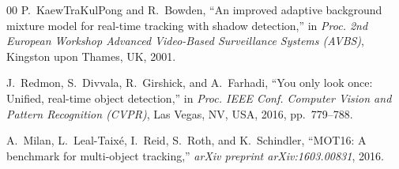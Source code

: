 \documentclass[10pt, conference, compsocconf]{IEEEtran}
\begin{document}
\begin{thebibliography}{00}
P.~KaewTraKulPong and R.~Bowden,
``An improved adaptive background mixture model for real-time
tracking with shadow detection,''
in \emph{Proc. 2nd European Workshop Advanced Video-Based
Surveillance Systems (AVBS)}, Kingston upon Thames, UK, 2001.

J.~Redmon, S.~Divvala, R.~Girshick, and A.~Farhadi,
``You only look once: Unified, real-time object detection,''
in \emph{Proc. IEEE Conf. Computer Vision and Pattern Recognition
(CVPR)}, Las Vegas, NV, USA, 2016, pp.~779--788.

A.~Milan, L.~Leal-Taix\'{e}, I.~Reid, S.~Roth, and K.~Schindler,
``MOT16: A benchmark for multi-object tracking,''
\emph{arXiv preprint arXiv:1603.00831}, 2016.

\end{thebibliography}
\end{document}
